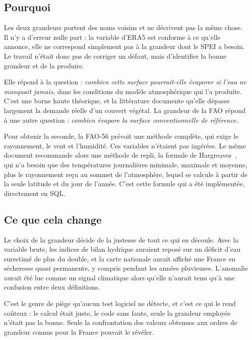 \subsection{Pourquoi}

Les deux grandeurs portent des noms voisins et ne décrivent pas la même chose. Il n'y a d'erreur
nulle part : la variable d'ERA5 est conforme à ce qu'elle annonce, elle ne correspond
simplement pas à la grandeur dont le SPEI a besoin. Le travail n'était donc pas de corriger un
défaut, mais d'identifier la bonne grandeur et de la produire.

Elle répond à la question : \emph{combien cette surface pourrait-elle évaporer si
l'eau ne manquait jamais}, dans les conditions du modèle atmosphérique qui l'a produite. C'est
une borne haute théorique, et la littérature documente qu'elle dépasse largement la demande
réelle d'un couvert végétal. La grandeur de la FAO répond à une autre question : \emph{combien
évapore la surface conventionnelle de référence}.

Pour obtenir la seconde, la FAO-56 prévoit une méthode complète, qui exige le rayonnement, le
vent et l'humidité. Ces variables n'étaient pas ingérées. Le même document recommande alors une
méthode de repli, la formule de Hargreaves~\cite{hargreaves1985}, qui n'a besoin que des
températures journalières minimale, maximale et moyenne, plus le rayonnement reçu au sommet de
l'atmosphère, lequel se calcule à partir de la seule latitude et du jour de l'année. C'est cette
formule qui a été implémentée, directement en SQL.

\subsection{Ce que cela change}

Le choix de la grandeur décide de la justesse de tout ce qui en découle. Avec la variable brute,
les indices de bilan hydrique auraient reposé sur un déficit d'eau surestimé de plus du double,
et la carte nationale aurait affiché une France en sécheresse quasi permanente, y compris
pendant les années pluvieuses. L'anomalie aurait été lue comme un signal climatique alors
qu'elle n'aurait tenu qu'à une confusion entre deux définitions.

C'est le genre de piège qu'aucun test logiciel ne détecte, et c'est ce qui le rend coûteux : le
calcul était juste, le code sans faute, seule la grandeur employée n'était pas la bonne. Seule
la confrontation des valeurs obtenues aux ordres de grandeur connus pour la France pouvait le
révéler.

